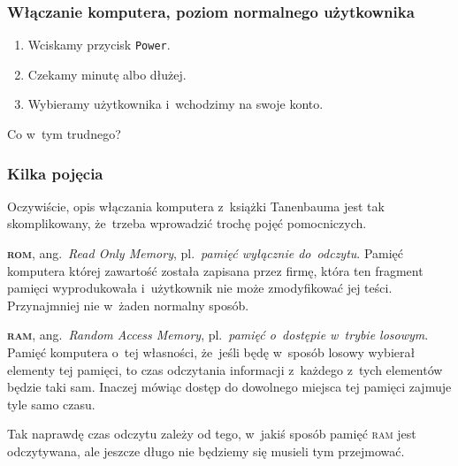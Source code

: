 \documentclass[10pt,t]{beamer}
\begin{document}
\begin{frame}
  \frametitle{Włączanie komputera, poziom normalnego użytkownika}


  \begin{enumerate}

  \item Wciskamy przycisk \texttt{Power}.

  \item Czekamy minutę albo dłużej.

  \item Wybieramy użytkownika i~wchodzimy na swoje konto.

  \end{enumerate}

  Co w~tym trudnego?

\end{frame}





\begin{frame}
  \frametitle{Kilka pojęcia}


  Oczywiście, opis włączania komputera z~książki Tanenbauma jest tak
  skomplikowany, że~trzeba wprowadzić trochę pojęć pomocniczych.

  \textbf{\textsc{rom}}, ang.~\textit{Read Only Memory}, pl.~\textit{pamięć
    wyłącznie do~odczytu}. Pamięć komputera której zawartość została
  zapisana przez firmę, która ten fragment pamięci wyprodukowała
  i~użytkownik nie może zmodyfikować jej teści. Przynajmniej nie w~żaden
  normalny sposób.

  \textbf{\textsc{ram}}, ang.~\textit{Random Access Memory},
  pl.~\textit{pamięć o~dostępie w~trybie losowym}. Pamięć komputera o~tej
  własności, że~jeśli będę w~sposób losowy wybierał elementy tej pamięci,
  to czas odczytania informacji z~każdego z~tych elementów będzie taki sam.
  Inaczej mówiąc dostęp do dowolnego miejsca tej pamięci zajmuje tyle samo
  czasu.

  Tak naprawdę czas odczytu zależy od tego, w~jakiś sposób pamięć
  \textsc{ram} jest odczytywana, ale jeszcze długo nie będziemy się musieli
  tym przejmować.

\end{frame}
\end{document}
